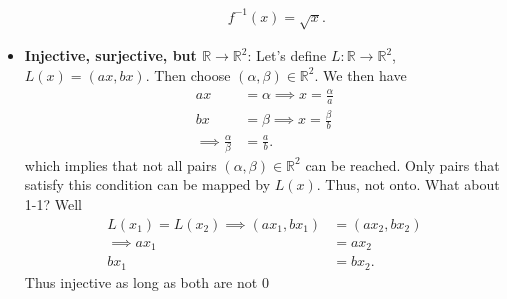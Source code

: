 \documentclass{report}
\begin{document}
\begin{itemize}
\begin{itemize}
                        \begin{align*}
                            f^{-1}(x) = \sqrt{x}
                        .\end{align*}
                \end{itemize}
            \item \textbf{Injective, surjective, but $\mathbb{R} \to \mathbb{R}^{2}$}: Let's define $L: \mathbb{R} \to \mathbb{R}^{2}$, $L(x) = (ax, bx)$. Then choose $(\alpha, \beta) \in \mathbb{R}^{2}$. We then have
                \begin{align*}
                    ax &= \alpha \implies x = \frac{\alpha}{a}\\
                    bx &= \beta \implies x = \frac{\beta}{b} \\
                    \implies \frac{\alpha}{\beta} &= \frac{a}{b}
                .\end{align*}
                which implies that not all pairs $(\alpha, \beta) \in \mathbb{R}^{2}$ can be reached. Only pairs that satisfy this condition can be mapped by $L(x)$. Thus, not onto.
                \bigbreak \noindent 
                What about 1-1? Well
                \begin{align*}
                    L(x_{1}) = L(x_{2}) \implies (ax_{1}, bx_{1}) &= (ax_{2}, bx_{2}) \\
                    \implies ax_{1} &= ax_{2} \\
                    bx_{1} &= bx_{2}
                .\end{align*}
                Thus injective as long as both are not $0$


\end{itemize}
\end{document}
